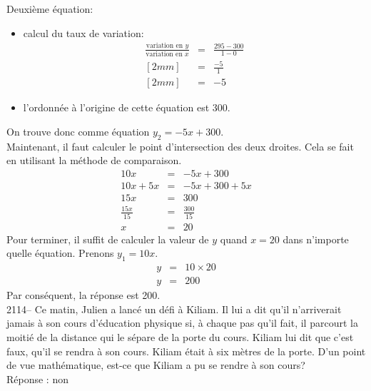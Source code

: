 \documentclass[letterpaper, 12pt]{article}
\begin{document}
Deuxi\`eme \'equation:
\begin{itemize}
 \item calcul du taux de variation:
\begin{eqnarray*}
 \frac{\textrm{variation en $y$}}{\textrm{variation en $x$}} &=& \frac{295-300}{1-0}\\ [2mm]
&=& \frac{-5}{1}\\ [2mm]
&=& -5
\end{eqnarray*}
\item l'ordonn\'ee \`a l'origine de cette \'equation est 300.
\end{itemize}
On trouve donc comme \'equation $y_{2}=-5x+300$.\\

Maintenant, il faut calculer le point d'intersection des deux droites. Cela se fait en utilisant la m\'ethode de comparaison.
\begin{eqnarray*}
 10x &=& -5x + 300 \\
 10x + 5x &=& -5x + 300 + 5x \\
 15x &=& 300 \\[2mm]
\frac{15x}{15} &=& \frac{300}{15}\\[2mm]
x &=& 20
\end{eqnarray*}
Pour terminer, il suffit de calculer la valeur de $y$ quand $x=20$ dans n'importe quelle \'equation. Prenons $y_{1}=10x$.
\begin{eqnarray*}
 y &=& 10 \times 20\\
y &=& 200
\end{eqnarray*}
Par cons\'equent, la r\'eponse est 200.\\

2114-- Ce matin, Julien a lanc\'e un d\'efi \`a Kiliam. Il lui a dit qu'il n'arriverait jamais \`a son cours d'\'education physique si, \`a chaque pas qu'il fait, il parcourt la moiti\'e de la distance qui le s\'epare de la porte du cours. Kiliam lui dit que c'est faux, qu'il se rendra \`a son cours. Kiliam \'etait \`a six m\`etres de la porte. D'un point de vue math\'ematique, est-ce que Kiliam a pu se rendre \`a son cours?  \\

R\'eponse : non\\
\end{document}
